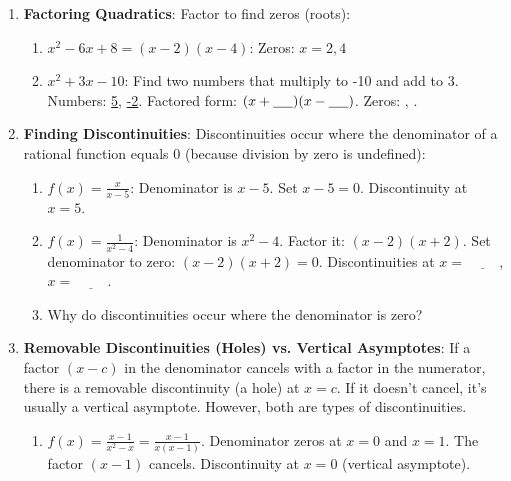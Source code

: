 \documentclass[12pt]{article}
\begin{document}
\begin{enumerate}[label=35.\arabic*]
    \item \textbf{Factoring Quadratics}: Factor to find zeros (roots):
    \begin{enumerate}[label=\alph*)]
        \item \( x^2 - 6x + 8 = (x - 2)(x - 4) \): Zeros: \( x = 2, 4 \)
        \item \( x^2 + 3x - 10 \): Find two numbers that multiply to -10 and add to 3. Numbers: \underline{5}, \underline{-2}.
        Factored form: \((x + \underline{\hspace{0.5cm}})(x - \underline{\hspace{0.5cm}})\). Zeros: \underline{\hspace{1cm}}, \underline{\hspace{1cm}}.
    \end{enumerate}
    \item \textbf{Finding Discontinuities}: Discontinuities occur where the denominator of a rational function equals 0 (because division by zero is undefined):
    \begin{enumerate}[label=\alph*)]
        \item \( f(x) = \frac{x}{x - 5} \): Denominator is \(x-5\). Set \(x-5=0\). Discontinuity at \( x = 5 \).
        \item \( f(x) = \frac{1}{x^2 - 4} \): Denominator is \(x^2-4\). Factor it: \((x-2)(x+2)\).
        Set denominator to zero: \((x-2)(x+2)=0\). Discontinuities at \( x = \underline{\hspace{1cm}} \), \( x = \underline{\hspace{1cm}} \).
        \item Why do discontinuities occur where the denominator is zero? \underline{\hspace{6cm}}
    \end{enumerate}
    \item \textbf{Removable Discontinuities (Holes) vs. Vertical Asymptotes}: If a factor \((x-c)\) in the denominator cancels with a factor in the numerator, there is a removable discontinuity (a hole) at \(x=c\). If it doesn't cancel, it's usually a vertical asymptote. However, both are types of discontinuities.
    \begin{enumerate}[label=\alph*)]
        \item \( f(x) = \frac{x - 1}{x^2 - x} = \frac{x - 1}{x(x - 1)} \).
        Denominator zeros at \(x=0\) and \(x=1\).
        The factor \((x-1)\) cancels.
        Discontinuity at \(x=0\) (vertical asymptote).

\end{enumerate}
\end{enumerate}
\end{document}
